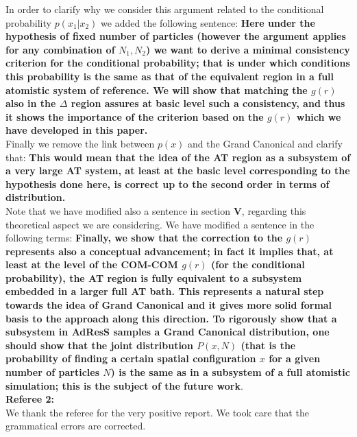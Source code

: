 \documentclass[a4paper]{article}
\begin{document}
In order to clarify why we consider this argument related to the conditional probability $p(x_{1}|x_{2})$ we added the following sentence: {\bf Here under the hypothesis of fixed number of particles (however the argument applies for any combination of $N_{1},N_{2}$) we want to derive a minimal consistency criterion for the conditional probability; that is under which conditions this probability is the same as that of the equivalent region in a full atomistic system of reference. We will show that matching the $g(r)$ also in the $\Delta$ region assures at basic level such a consistency, and thus it shows the importance of the criterion based on the $g(r)$ which we have developed in this paper.}\\
Finally we remove the link between $p(x)$ and the Grand Canonical and clarify that: {\bf This would mean that the idea of the AT region as a subsystem of a very large AT system, at least at the basic level corresponding to the hypothesis done here, is correct up to the second order in terms of distribution.} 
\\
Note that we have modified also a sentence in section {\bf V}, regarding this theoretical aspect we are considering. We have modified a sentence in the following terms: {\bf Finally, we show that the correction to the $g(r)$ represents also a conceptual advancement; in fact it implies that, at least at the level of the COM-COM $g(r)$ (for the conditional probability), the AT region is fully equivalent to a subsystem embedded in a larger full AT bath. This  represents a natural step towards the idea of Grand Canonical and it gives more solid formal basis to the approach along this direction. To rigorously show that a subsystem in AdResS samples a Grand Canonical distribution, one should show that the joint distribution $P(x,N)$ (that is the probability of finding a certain spatial configuration $x$ for a given number of particles $N$) is the same as in a subsystem of a full atomistic simulation; this is the subject of the future work}.\\

\vskip 1cm
\noindent
{\bf Referee 2:}\\

We thank the referee for the very positive report. We took care that the grammatical errors are corrected.\\
\end{document}
